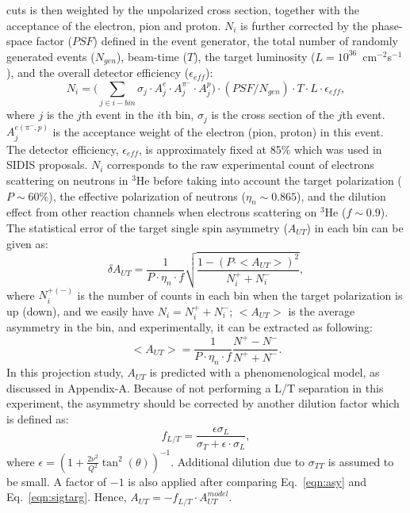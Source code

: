 cuts is then weighted by the unpolarized cross section, together with the
acceptance of the electron, pion and proton. $N_{i}$ is further corrected by
the phase-space factor ($PSF$) defined in the event generator, the total number
of randomly generated events ($N_{gen}$), beam-time ($T$), the target
luminosity ($L=10^{36}$~cm$^{-2}$s$^{-1}$), and the overall detector efficiency 
($\epsilon_{eff}$):
 \begin{equation}
     N_{i} = \bigl(\sum_{j\in i-bin} \sigma_{j}\cdot A^{e}_{j} \cdot
     A^{\pi^{-}}_{j} \cdot A^{p}_{j}\bigr) \cdot (PSF/N_{gen}) \cdot T \cdot L \cdot
     \epsilon_{eff},
     \label{ncount}
 \end{equation}
where $j$ is the $j$th event in the $i$th bin, $\sigma_{j}$ is the cross
section of the $j$th event. $A^{e(\pi^{-},p)}_{j}$ is the acceptance weight of the
electron (pion, proton) in this event. The detector efficiency,
$\epsilon_{eff}$, is approximately fixed at 85\% which was used in SIDIS
proposals. $N_{i}$ corresponds to the raw experimental count of electrons
scattering on neutrons in $\mathrm{^{3}He}$ before taking into account the
target polarization ($P\sim60\%$), the effective polarization of neutrons
($\eta_{n}\sim0.865$), and the dilution effect from other reaction channels
when electrons scattering on $\mathrm{^{3}He}$ ($f \sim 0.9$). The statistical
error of the target single spin asymmetry ($A_{UT}$) in each bin can be given
as:
  \begin{equation}
    \delta A_{UT} = \frac{1}{P\cdot\eta_{n}\cdot f} \sqrt{\frac{1-(P\cdot
        <A_{UT}>)^{2}}{N^{+}_{i}+N^{-}_{i}}},
    \label{stat_err}
 \end{equation}
where $N^{+(-)}_{i}$ is the number of counts in each bin when the target
polarization is up (down), and we easily have $N_{i}=N^{+}_{i}+N^{-}_{i}$;
$<A_{UT}>$ is the average asymmetry in the bin, and experimentally, it can be
extracted as following:
\begin{equation}
   <A_{UT}> = \frac{1}{P\cdot\eta_{n}\cdot f} \frac{N^{+}-N^{-}}{N^{+}+N^{-}}.
   \label{asym_exp}
\end{equation}
In this projection study, $A_{UT}$ is predicted with a phenomenological model,
as discussed in Appendix-A. Because of not performing a L/T separation in this
experiment, the asymmetry should be corrected by another dilution factor which
is defined as:
\begin{equation}
  f_{L/T} =\frac{\epsilon\sigma_{L} }{\sigma_{T}+\epsilon\cdot\sigma_{L} },
\end{equation} 
where $\epsilon=(1+\frac{2\nu^{2}}{Q^{2}}\tan^{2}(\theta))^{-1}$. Additional dilution
due to $\sigma_{TT}$ is assumed to be small.  A factor of $-1$ is also applied after comparing Eq.~\ref{eqn:asy} and Eq.~\ref{eqn:sigtarg}. Hence, $A_{UT} = -f_{L/T}\cdot A_{UT}^{model}$.


